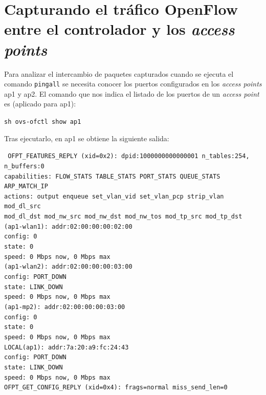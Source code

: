 \documentclass[a4paper,12pt,twoside,spanish]{book}
\begin{document}
\section{Capturando el tráfico OpenFlow entre el controlador y los \textit{access points}}\label{sect:capt_of}

Para analizar el intercambio de paquetes capturados cuando se ejecuta el comando \texttt{pingall} se necesita conocer los puertos configurados en los \textit{access points} ap1 y ap2. El comando que nos indica el listado de los puertos de un \textit{access point} es (aplicado para ap1):\par 

\begin{center}
	\texttt{sh ovs-ofctl show ap1}
\end{center}

Tras ejecutarlo, en ap1 se obtiene la siguiente salida:

\noindent\texttt{
\indent OFPT\_FEATURES\_REPLY (xid=0x2): dpid:1000000000000001 n\_tables:254,    \\ 
\indent \indent n\_buffers:0\\
\indent capabilities: FLOW\_STATS TABLE\_STATS PORT\_STATS QUEUE\_STATS \\ 
\indent \indent ARP\_MATCH\_IP\\
\indent actions: output enqueue set\_vlan\_vid set\_vlan\_pcp strip\_vlan mod\_dl\_src\\ 
\indent \indent mod\_dl\_dst mod\_nw\_src mod\_nw\_dst mod\_nw\_tos mod\_tp\_src mod\_tp\_dst\\
(ap1-wlan1): addr:02:00:00:00:02:00\\
\indent \indent config:     0\\
\indent \indent state:      0\\
\indent \indent speed: 0 Mbps now, 0 Mbps max\\
(ap1-wlan2): addr:02:00:00:00:03:00\\
\indent \indent config:     PORT\_DOWN\\
\indent \indent state:      LINK\_DOWN\\
\indent \indent speed: 0 Mbps now, 0 Mbps max\\
(ap1-mp2): addr:02:00:00:00:03:00\\
\indent \indent config:     0\\
\indent \indent state:      0\\
\indent \indent speed: 0 Mbps now, 0 Mbps max\\
\indent LOCAL(ap1): addr:7a:20:a9:fc:24:43\\
\indent \indent config:     PORT\_DOWN\\
\indent \indent state:      LINK\_DOWN\\
\indent \indent speed: 0 Mbps now, 0 Mbps max\\
\indent OFPT\_GET\_CONFIG\_REPLY (xid=0x4): frags=normal miss\_send\_len=0\\
}\par
\end{document}
